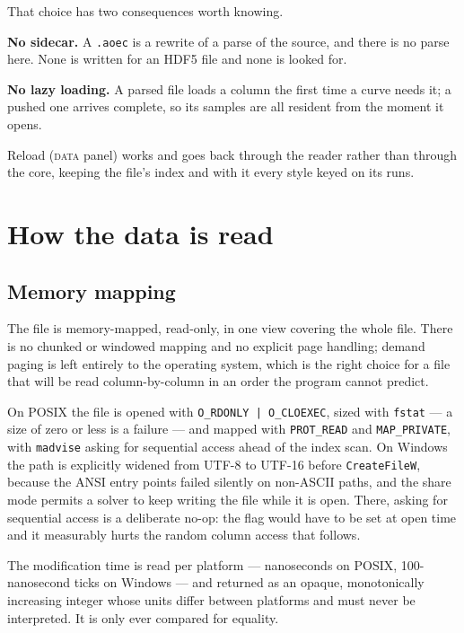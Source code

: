 \documentclass[11pt,a4paper,oneside]{report}
\newcommand{\code}[1]{\texttt{#1}}
\begin{document}
That choice has two consequences worth knowing.

\begin{aoelimit}
\textbf{No sidecar.} A \code{.aoec} is a rewrite of a parse of the source, and
there is no parse here. None is written for an HDF5 file and none is looked
for.

\textbf{No lazy loading.} A parsed file loads a column the first time a curve
needs it; a pushed one arrives complete, so its samples are all resident from
the moment it opens.
\end{aoelimit}

Reload (\textsc{data} panel) works and goes back through the reader rather than
through the core, keeping the file's index and with it every style keyed on its
runs.

\chapter{How the data is read}
\label{ch:reading}

\section{Memory mapping}

The file is memory-mapped, read-only, in one view covering the whole file. There
is no chunked or windowed mapping and no explicit page handling; demand paging is
left entirely to the operating system, which is the right choice for a file that
will be read column-by-column in an order the program cannot predict.

On POSIX the file is opened with \code{O\_RDONLY | O\_CLOEXEC}, sized with
\code{fstat} --- a size of zero or less is a failure --- and mapped with
\code{PROT\_READ} and \code{MAP\_PRIVATE}, with \code{madvise} asking for
sequential access ahead of the index scan. On Windows the path is explicitly
widened from UTF-8 to UTF-16 before \code{CreateFileW}, because the ANSI entry
points failed silently on non-ASCII paths, and the share mode permits a solver to
keep writing the file while it is open. There, asking for sequential access is a
deliberate no-op: the flag would have to be set at open time and it measurably
hurts the random column access that follows.

The modification time is read per platform --- nanoseconds on POSIX,
100-nanosecond ticks on Windows --- and returned as an opaque, monotonically
increasing integer whose units differ between platforms and must never be
interpreted. It is only ever compared for equality.
\end{document}
